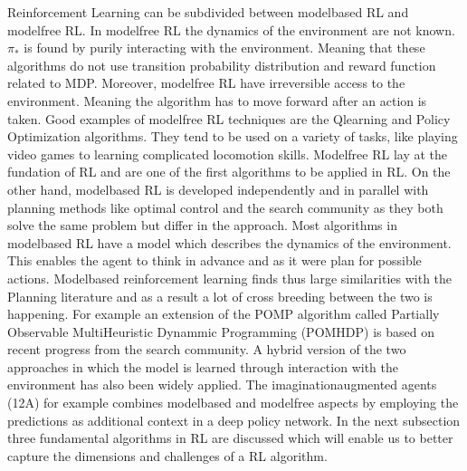 \documentclass[letterpaper,10pt,english]{jupyterBook}
\begin{document}
\sphinxAtStartPar
Reinforcement Learning can be subdivided between model\sphinxhyphen{}based RL and model\sphinxhyphen{}free RL. In model\sphinxhyphen{}free RL the dynamics of the environment are not known. \(\pi_*\) is found by purily interacting with the environment. Meaning that these algorithms do not use transition probability distribution and reward function related to MDP. Moreover, model\sphinxhyphen{}free RL have irreversible access to the environment. Meaning the algorithm has to move forward after an action is taken. Good examples of model\sphinxhyphen{}free RL techniques are the Q\sphinxhyphen{}learning and Policy Optimization algorithms. They tend to be used on a variety of tasks, like playing video games to learning complicated locomotion skills. Model\sphinxhyphen{}free RL lay at the fundation of RL and are one of the first algorithms to be applied in RL. On the other hand, model\sphinxhyphen{}based RL is developed independently and in parallel with planning methods like optimal control and the search community as they both solve the same problem but differ in the approach. Most algorithms in model\sphinxhyphen{}based RL have a model which describes the dynamics of the environment. This enables the agent to think in advance and as it were plan for possible actions. Model\sphinxhyphen{}based reinforcement learning finds thus large similarities with the Planning literature and as a result a lot of cross breeding between the two is happening. For example an extension of the POMP algorithm called Partially Observable Multi\sphinxhyphen{}Heuristic Dynammic Programming (POMHDP) is based on recent progress from the search community. A hybrid version of the two approaches in which the model is learned through interaction with the environment has also been widely applied. The imagination\sphinxhyphen{}augmented agents (12A) for example combines model\sphinxhyphen{}based and model\sphinxhyphen{}free aspects by employing the predictions as additional context in a deep policy network.  In the next subsection three fundamental algorithms in RL are discussed which will enable us to better capture the dimensions and challenges of a RL algorithm.
\end{document}
